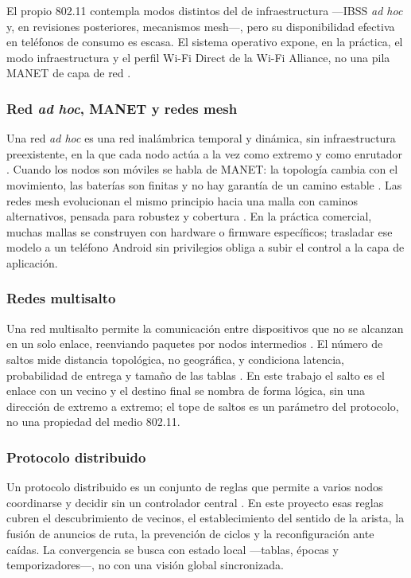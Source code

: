 \documentclass[12pt,oneside]{scrreprt}
\begin{document}
El propio 802.11 contempla modos distintos del de infraestructura ---IBSS \emph{ad hoc} y, en revisiones posteriores, mecanismos mesh---, pero su disponibilidad efectiva en teléfonos de consumo es escasa. El sistema operativo expone, en la práctica, el modo infraestructura y el perfil Wi-Fi Direct de la Wi-Fi Alliance, no una pila MANET de capa de red \parencite{IEEE2020,WiFiAlliance2010}.

\subsubsection{Red \emph{ad hoc}, MANET y redes mesh}

Una red \emph{ad hoc} es una red inalámbrica temporal y dinámica, sin infraestructura preexistente, en la que cada nodo actúa a la vez como extremo y como enrutador \parencite{Perkins2001,Toh2002}. Cuando los nodos son móviles se habla de MANET: la topología cambia con el movimiento, las baterías son finitas y no hay garantía de un camino estable \parencite{Conti2014}. Las redes mesh evolucionan el mismo principio hacia una malla con caminos alternativos, pensada para robustez y cobertura \parencite{Akyildiz2005}. En la práctica comercial, muchas mallas se construyen con hardware o firmware específicos; trasladar ese modelo a un teléfono Android sin privilegios obliga a subir el control a la capa de aplicación.

\subsubsection{Redes multisalto}

Una red multisalto permite la comunicación entre dispositivos que no se alcanzan en un solo enlace, reenviando paquetes por nodos intermedios \parencite{Gupta2000}. El número de saltos mide distancia topológica, no geográfica, y condiciona latencia, probabilidad de entrega y tamaño de las tablas \parencite{Zhao2003}. En este trabajo el salto es el enlace con un vecino y el destino final se nombra de forma lógica, sin una dirección de extremo a extremo; el tope de saltos es un parámetro del protocolo, no una propiedad del medio 802.11.

\subsubsection{Protocolo distribuido}

Un protocolo distribuido es un conjunto de reglas que permite a varios nodos coordinarse y decidir sin un controlador central \parencite{TanenbaumVanSteen2007}. En este proyecto esas reglas cubren el descubrimiento de vecinos, el establecimiento del sentido de la arista, la fusión de anuncios de ruta, la prevención de ciclos y la reconfiguración ante caídas. La convergencia se busca con estado local ---tablas, épocas y temporizadores---, no con una visión global sincronizada.
\end{document}
